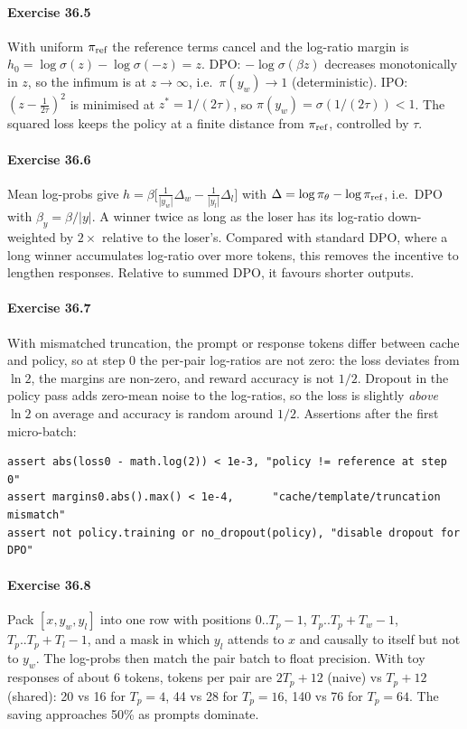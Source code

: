 \paragraph{Exercise 36.5} With uniform $\pi_{\text{ref}}$ the reference terms cancel and the log-ratio
margin is $h_0=\log\sigma(z)-\log\sigma(-z)=z$. DPO: $-\log\sigma(\beta z)$ decreases monotonically
in $z$, so the infimum is at $z\to\infty$, i.e.\ $\pi(y_w)\to1$ (deterministic). IPO:
$(z-\frac{1}{2\tau})^2$ is minimised at $z^*=1/(2\tau)$, so $\pi(y_w)=\sigma(1/(2\tau))<1$. The
squared loss keeps the policy at a finite distance from $\pi_{\text{ref}}$, controlled by $\tau$.

\paragraph{Exercise 36.6} Mean log-probs give
$h=\beta\big[\frac{1}{|y_w|}\Delta_w-\frac{1}{|y_l|}\Delta_l\big]$ with
$\Delta=\log\pi_\theta-\log\pi_{\text{ref}}$, i.e.\ DPO with $\beta_y=\beta/|y|$. A winner twice as long as
the loser has its log-ratio down-weighted by $2\times$ relative to the loser's. Compared with
standard DPO, where a long winner accumulates log-ratio over more tokens, this removes the
incentive to lengthen responses. Relative to summed DPO, it favours shorter outputs.

\paragraph{Exercise 36.7} With mismatched truncation, the prompt or response tokens differ between
cache and policy, so at step 0 the per-pair log-ratios are not zero: the loss deviates from
$\ln 2$, the margins are non-zero, and reward accuracy is not $1/2$. Dropout in the policy pass
adds zero-mean noise to the log-ratios, so the loss is slightly \emph{above} $\ln 2$ on average and
accuracy is random around $1/2$. Assertions after the first micro-batch:
\begin{lstlisting}
assert abs(loss0 - math.log(2)) < 1e-3, "policy != reference at step 0"
assert margins0.abs().max() < 1e-4,      "cache/template/truncation mismatch"
assert not policy.training or no_dropout(policy), "disable dropout for DPO"
\end{lstlisting}

\paragraph{Exercise 36.8} Pack $[x, y_w, y_l]$ into one row with positions
$0..T_p{-}1$, $T_p..T_p{+}T_w{-}1$, $T_p..T_p{+}T_l{-}1$, and a mask in which $y_l$ attends to $x$ and
causally to itself but not to $y_w$. The log-probs then match the pair batch to float precision. With
toy responses of about 6 tokens, tokens per pair are $2T_p+12$ (naive) vs $T_p+12$ (shared): 20 vs 16
for $T_p=4$, 44 vs 28 for $T_p=16$, 140 vs 76 for $T_p=64$. The saving approaches 50\% as prompts
dominate.

